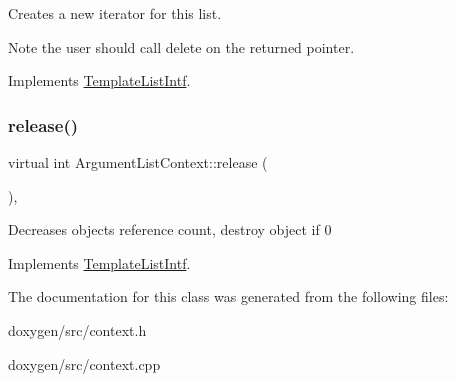 Creates a new iterator for this list. \begin{DoxyNote}{Note}
the user should call delete on the returned pointer. 
\end{DoxyNote}


Implements \mbox{\hyperlink{class_template_list_intf_a56b82384db24c3e121076a1da046d378}{Template\+List\+Intf}}.

\mbox{\label{class_argument_list_context_a7e22b3f45a889508dba94e578c8661f2}} 
\subsubsection{\texorpdfstring{release()}{release()}}
{\footnotesize\ttfamily virtual int Argument\+List\+Context\+::release (\begin{DoxyParamCaption}{ }\end{DoxyParamCaption})\hspace{0.3cm}{\ttfamily [inline]}, {\ttfamily [virtual]}}

Decreases object\textquotesingle{}s reference count, destroy object if 0 

Implements \mbox{\hyperlink{class_template_list_intf_a0c53169c740c09dac47efc62bbe39674}{Template\+List\+Intf}}.



The documentation for this class was generated from the following files\+:\begin{DoxyCompactItemize}
\item 
doxygen/src/context.\+h\item 
doxygen/src/context.\+cpp\end{DoxyCompactItemize}
